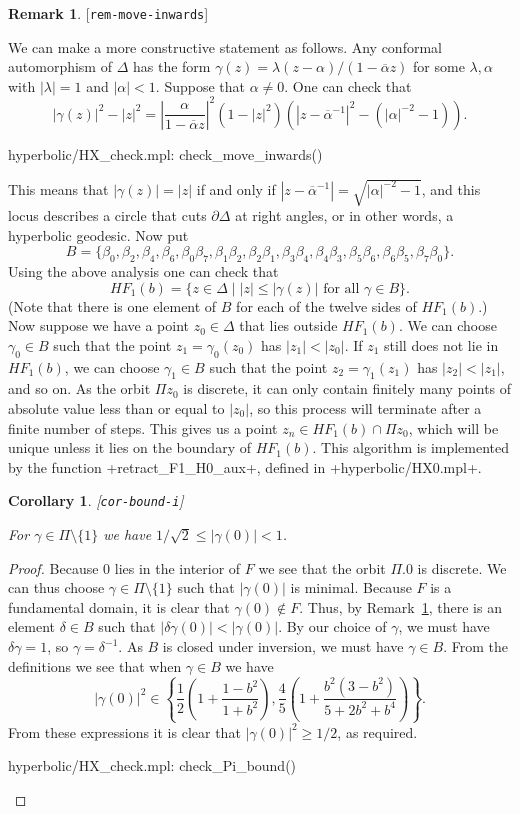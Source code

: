 \documentclass[reqno]{amsart}
\newcommand{\lbl}[1]{\label{#1}\textup{[\texttt{#1}]}\par}
\newcommand{\lbl}{\label}
\newcommand{\Dl}        {\Delta}
\newcommand{\al}        {\alpha}
\newcommand{\bt}        {\beta}
\newcommand{\gm}        {\gamma}
\newcommand{\dl}        {\delta}
\newcommand{\lm}        {\lambda}
\newcommand{\ov}[1]     {\overline{#1}}
\newcommand{\st}        {\;|\;}
\newcommand{\sm}        {\setminus}
\renewcommand{\:}{\colon}
\newtheorem{corollary}[theorem]{Corollary}
\theoremstyle{definition}
\newtheorem{remark}[theorem]{Remark}
\begin{document}
\begin{remark}\lbl{rem-move-inwards}
 We can make a more constructive statement as follows.  Any conformal
 automorphism of $\Dl$ has the form $\gm(z)=\lm(z-\al)/(1-\ov{\al}z)$
 for some $\lm,\al$ with $|\lm|=1$ and $|\al|<1$.  Suppose that
 $\al\neq 0$.  One can check that
 \[ |\gm(z)|^2 - |z|^2 =
     \left|\frac{\al}{1-\ov{\al}z}\right|^2
     (1-|z|^2) \left(|z-\ov{\al}^{-1}|^2-(|\al|^{-2}-1)\right).
 \]
 \begin{checks}
  hyperbolic/HX_check.mpl: check_move_inwards()
 \end{checks}
 This means that $|\gm(z)|=|z|$ if and only if
 $|z-\ov{\al}^{-1}|=\sqrt{|\al|^{-2}-1}$, and this locus describes a circle 
 that cuts $\partial\Dl$ at right angles, or in other words, a
 hyperbolic geodesic.  Now put
 \[ B = \{\bt_0,\bt_2,\bt_4,\bt_6,
          \bt_0\bt_7,\bt_1\bt_2,\bt_2\bt_1,\bt_3\bt_4,
          \bt_4\bt_3,\bt_5\bt_6,\bt_6\bt_5,\bt_7\bt_0\}.
 \]
 Using the above analysis one can check that
 \[ HF_1(b) = \{z\in\Dl\st |z|\leq |\gm(z)| \text{ for all } \gm\in B\}.
 \]
 (Note that there is one element of $B$ for each of the twelve sides
 of $HF_1(b)$.)  Now suppose we have a point $z_0\in\Dl$ that lies
 outside $HF_1(b)$.  We can choose $\gm_0\in B$ such that the point
 $z_1=\gm_0(z_0)$ has $|z_1|<|z_0|$.  If $z_1$ still does not lie in
 $HF_1(b)$, we can choose $\gm_1\in B$ such that the point
 $z_2=\gm_1(z_1)$ has $|z_2|<|z_1|$, and so on.  As the orbit
 $\Pi z_0$ is discrete, it can only contain finitely many points of
 absolute value less than or equal to $|z_0|$, so this process will
 terminate after a finite number of steps.  This gives us a point
 $z_n\in HF_1(b)\cap\Pi z_0$, which will be unique unless it lies on
 the boundary of $HF_1(b)$.  This algorithm is implemented by the
 function \mcode+retract_F1_H0_aux+, defined in
 \fname+hyperbolic/HX0.mpl+.
\end{remark}

\begin{corollary}\lbl{cor-bound-i}
 For $\gm\in\Pi\sm\{1\}$ we have $1/\sqrt{2}\leq|\gm(0)|<1$.
\end{corollary}
\begin{proof}
 Because $0$ lies in the interior of $F$ we see that the orbit $\Pi.0$
 is discrete.  We can thus choose $\gm\in\Pi\sm\{1\}$ such that
 $|\gm(0)|$ is minimal.  Because $F$ is a fundamental domain, it is
 clear that $\gm(0)\not\in F$.  Thus, by
 Remark~\ref{rem-move-inwards}, there is an element $\dl\in B$
 such that $|\dl\gm(0)|<|\gm(0)|$.  By our choice of $\gm$, we must
 have $\dl\gm=1$, so $\gm=\dl^{-1}$.  As $B$ is closed under
 inversion, we must have $\gm\in B$.  From the definitions we see
 that when $\gm\in B$ we have
 \[ |\gm(0)|^2 \in \left\{
      \frac{1}{2}\left(1+\frac{1-b^2}{1+b^2}\right),
      \frac{4}{5}\left(1+\frac{b^2(3-b^2)}{5+2b^2+b^4}\right)
     \right\}.
 \]
 From these expressions it is clear that $|\gm(0)|^2\geq 1/2$, as
 required.
 \begin{checks}
  hyperbolic/HX_check.mpl: check_Pi_bound()
 \end{checks}
\end{proof}
\end{document}
